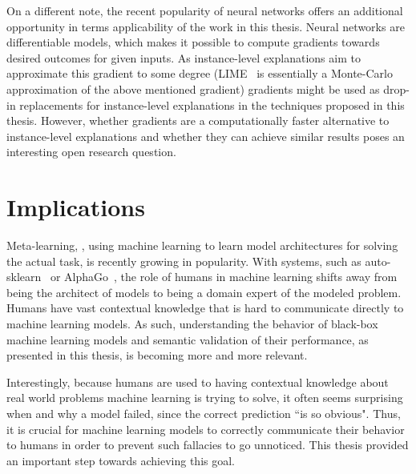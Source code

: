On a different note, the recent popularity of neural networks offers an additional opportunity in terms applicability of the work in this thesis.
Neural networks are differentiable models, which makes it possible to compute gradients towards desired outcomes for given inputs.
As instance-level explanations aim to approximate this gradient to some degree (LIME~\cite{DBLP:journals/corr/RibeiroSG16} is essentially a Monte-Carlo approximation of the above mentioned gradient) gradients might be used as drop-in replacements for instance-level explanations in the techniques proposed in this thesis.
However, whether gradients are a computationally faster alternative to instance-level explanations and whether they can achieve similar results poses an interesting open research question.

\section{Implications}
Meta-learning, \ie, using machine learning to learn model architectures for solving the actual task, is recently growing in popularity.
With systems, such as auto-sklearn~\cite{NIPS2015_5872} or AlphaGo~\cite{silver2016mastering}, the role of humans in machine learning shifts away from being the architect of models to being a domain expert of the modeled problem.
Humans have vast contextual knowledge that is hard to communicate directly to machine learning models.
As such, understanding the behavior of black-box machine learning models and semantic validation of their performance, as presented in this thesis, is becoming more and more relevant.

Interestingly, because humans are used to having contextual knowledge about real world problems machine learning is trying to solve, it often seems surprising when and why a model failed, since the correct prediction ``is so obvious".
Thus, it is crucial for machine learning models to correctly communicate their behavior to humans in order to prevent such fallacies to go unnoticed.
This thesis provided an important step towards achieving this goal.


